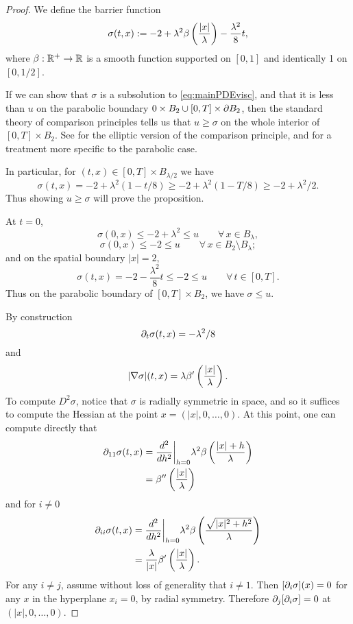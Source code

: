 \begin{proof}
%
We define the barrier function
\[ \sigma(t,x) := -2 + \lambda^2 \beta\left( \frac{|x|}{\lambda} \right) - \frac{\lambda^2}{8} t,\] 
where $\beta:\mathbb{R}^+ \to \mathbb{R}$ is a smooth function supported on $[0,1]$ and identically 1 on $[0,1/2]$.  

If we can show that $\sigma$ is a subsolution to \eqref{eq:mainPDEvisc}, and that it is less than $u$ on the parabolic boundary $0 \times B_2 \cup [0,T]\times \partial B_2$, then the standard theory of comparison principles tells us that $u \geq \sigma$ on the whole interior of $[0,T]\times B_2$.  See \cite{Cr} for the elliptic version of the comparison principle, and \cite{Ju} for a treatment more specific to the parabolic case.  

In particular, for $(t,x) \in [0,T] \times B_{\lambda/2}$ we have
\[\sigma(t,x) = -2 + \lambda^2 (1-t/8) \geq -2 + \lambda^2 (1-T/8) \geq -2 + \lambda^2/2. \]  
Thus showing $u \geq \sigma$ will prove the proposition.  


At $t = 0$, 
\[ \sigma(0,x) \leq -2 + \lambda^2 \leq u \qquad \forall \, x \in B_\lambda, \]
\[ \sigma(0,x) \leq -2  \leq u \qquad \forall \, x \in B_2 \setminus B_\lambda; \]
and on the spatial boundary $|x|=2$, 
\[ \sigma(t,x) = -2 - \frac{\lambda^2}{8} t \leq -2 \leq u \qquad \forall \, t \in [0,T].\]
Thus on the parabolic boundary of $[0,T] \times B_2$, we have $\sigma \leq u$.  


By construction 
\[ \partial_t \sigma(t,x) = -\lambda^2/8 \]  
and
\[ |\nabla \sigma|(t,x) = \lambda \beta'\left( \frac{|x|}{\lambda} \right). \] 
To compute $D^2 \sigma$, notice that $\sigma$ is radially symmetric in space, and so it suffices to compute the Hessian at the point $x = (|x|,0,\ldots,0)$.  At this point, one can compute directly that
\begin{align*} 
\partial_{11} \sigma(t,x) &= \frac{d^2}{dh^2} \bigg\rvert_{h=0}  \lambda^2 \beta\left( \frac{|x|+h}{\lambda} \right) 
\\ &= \beta''\left( \frac{|x|}{\lambda} \right)
\end{align*}
and for $i \neq 0$
\begin{align*} 
\partial_{ii} \sigma(t,x) &= \frac{d^2}{dh^2} \bigg\rvert_{h=0}  \lambda^2 \beta\left( \frac{\sqrt{|x|^2 + h^2}}{\lambda} \right) 
\\ &= \frac{\lambda}{|x|} \beta'\left( \frac{|x|}{\lambda} \right).
\end{align*}
For any $i \neq j$, assume without loss of generality that $i \neq 1$.  Then $[\partial_i \sigma](x) = 0$ for any $x$ in the hyperplane $x_i = 0$, by radial symmetry.  Therefore $\partial_j [\partial_i \sigma] = 0$ at $(|x|,0,\ldots,0)$.  


\end{proof}
